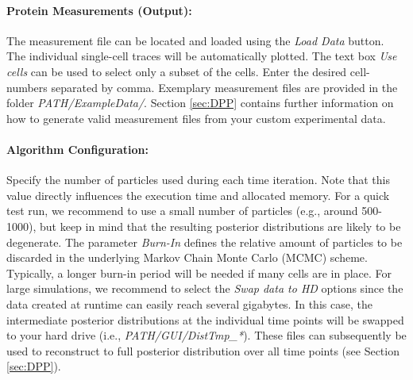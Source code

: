 \documentclass[a4paper, 9pt]{scrartcl}
\begin{document}
\paragraph{Protein Measurements (Output):} The measurement file can be located and loaded using the \textit{Load Data} button. The individual single-cell traces will be automatically plotted. The text box \textit{Use cells} can be used to select only a subset of the cells. Enter the desired cell-numbers separated by comma. Exemplary measurement files are provided in the folder \textit{PATH/ExampleData/}. Section \ref{sec:DPP} contains further information on how to generate valid measurement files from your custom experimental data.

\paragraph{Algorithm Configuration:} Specify the number of particles used during each time iteration. Note that this value directly influences the execution time and allocated memory. For a quick test run, we recommend to use a small number of particles (e.g., around 500-1000), but keep in mind that the resulting posterior distributions are likely to be degenerate. The parameter \textit{Burn-In} defines the relative amount of particles to be discarded in the underlying Markov Chain Monte Carlo (MCMC) scheme. Typically, a longer burn-in period will be needed if many cells are in place. For large simulations, we recommend to select the \textit{Swap data to HD} options since the data created at runtime can easily reach several gigabytes. In this case, the intermediate posterior distributions at the individual time points will be swapped to your hard drive (i.e., \textit{PATH/GUI/DistTmp\_*}). These files can subsequently be used to reconstruct to full posterior distribution over all time points (see Section \ref{sec:DPP}).%
\end{document}
